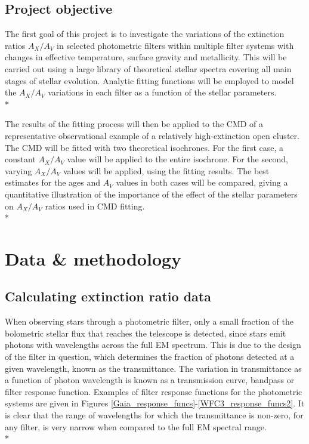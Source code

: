 \documentclass[12pt, a4paper]{report}
\begin{document}
\section{Project objective}
The first goal of this project is to investigate the variations of the extinction ratios $A_{X}/A_{V}$ in selected photometric filters within multiple filter systems with changes in effective temperature, surface gravity and metallicity. This will be carried out using a large library of theoretical stellar spectra covering all main stages of stellar evolution. Analytic fitting functions will be employed to model the $A_{X}/A_{V}$ variations in each filter as a function of the stellar parameters. \\*

The results of the fitting process will then be applied to the CMD of a representative observational example of a relatively high-extinction open cluster. The CMD will be fitted with two theoretical isochrones. For the first case, a constant $A_{X}/A_{V}$ value will be applied to the entire isochrone. For the second, varying $A_{X}/A_{V}$ values will be applied, using the fitting results. The best estimates for the ages and $A_{V}$ values in both cases will be compared, giving a quantitative illustration of the importance of the effect of the stellar parameters on $A_{X}/A_{V}$ ratios used in CMD fitting.\\*



\chapter{Data \& methodology}

\section{Calculating extinction ratio data} \label{ext_ratio_data}

When observing stars through a photometric filter, only a small fraction of the bolometric stellar flux that reaches the telescope is detected, since stars emit photons with wavelengths across the full EM spectrum. This is due to the design of the filter in question, which determines the fraction of photons detected at a given wavelength, known as the transmittance. The variation in transmittance as a function of photon wavelength is known as a transmission curve, bandpass or filter response function. Examples of filter response functions for the photometric systems are given in Figures \ref{Gaia_response_funcs}-\ref{WFC3_response_funcs2}. It is clear that the range of wavelengths for which the transmittance is non-zero, for any filter, is very narrow when compared to the full EM spectral range.\\* 
\end{document}
